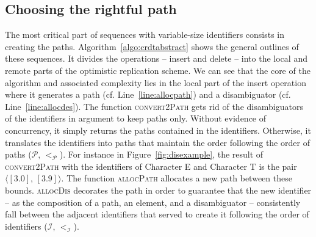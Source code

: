 

\subsection{Choosing the rightful path}
\label{subsec:choosing}

The most critical part of sequences with variable-size identifiers consists in
creating the paths. Algorithm~\ref{algo:crdtabstract} shows the general outlines
of these sequences. It divides the operations -- insert and delete -- into the
local and remote parts of the optimistic replication scheme. We can see that the
core of the algorithm and associated complexity lies in the local part of the
insert operation where it generates a path (cf. Line~\ref{line:allocpath}) and a
disambiguator (cf. Line~\ref{line:allocdes}). The function \textsc{convert2Path}
gets rid of the disambiguators of the identifiers in argument to keep paths
only. Without evidence of concurrency, it simply returns the paths contained in
the identifiers. Otherwise, it translates the identifiers into paths that
maintain the order following the order of paths
($\mathcal{P},\, <_{\mathcal{P}}$). For instance in Figure~\ref{fig:disexample},
the result of \textsc{convert2Path} with the identifiers of Character E and
Character T is the pair $\langle [3.0],\, [3.9]\rangle$. The function
\textsc{allocPath} allocates a new path between these bounds.  \textsc{allocDis}
decorates the path in order to guarantee that the new identifier -- as the
composition of a path, an element, and a disambiguator -- consistently fall
between the adjacent identifiers that served to create it following the order of
identifiers ($\mathcal{I}, \, <_\mathcal{I}$).

